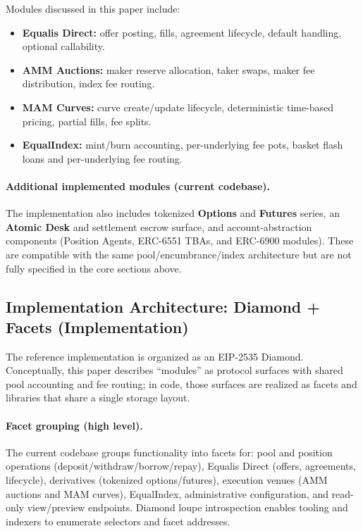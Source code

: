 \documentclass[version=preprint]{iacrcc}
\begin{document}
Modules discussed in this paper include:
\begin{itemize}
  \item \textbf{Equalis Direct:} offer posting, fills, agreement lifecycle, default handling, optional callability.
  \item \textbf{AMM Auctions:} maker reserve allocation, taker swaps, maker fee distribution, index fee routing.
  \item \textbf{MAM Curves:} curve create/update lifecycle, deterministic time-based pricing, partial fills, fee splits.
  \item \textbf{EqualIndex:} mint/burn accounting, per-underlying fee pots, basket flash loans and per-underlying fee routing.
\end{itemize}

\paragraph{Additional implemented modules (current codebase).}
The implementation also includes tokenized \textbf{Options} and \textbf{Futures} series, an \textbf{Atomic Desk} and settlement escrow surface, and account-abstraction components (Position Agents, ERC-6551 TBAs, and ERC-6900 modules). These are compatible with the same pool/encumbrance/index architecture but are not fully specified in the core sections above.

\subsection{Implementation Architecture: Diamond + Facets (Implementation)}

The reference implementation is organized as an EIP-2535 Diamond. Conceptually, this paper describes ``modules'' as protocol surfaces with shared pool accounting and fee routing; in code, those surfaces are realized as facets and libraries that share a single storage layout.

\paragraph{Facet grouping (high level).}
The current codebase groups functionality into facets for: pool and position operations (deposit/withdraw/borrow/repay), Equalis Direct (offers, agreements, lifecycle), derivatives (tokenized options/futures), execution venues (AMM auctions and MAM curves), EqualIndex, administrative configuration, and read-only view/preview endpoints. Diamond loupe introspection enables tooling and indexers to enumerate selectors and facet addresses.
\end{document}
